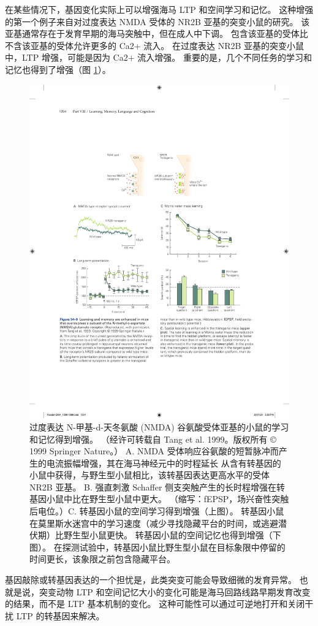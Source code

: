 在某些情况下，基因变化实际上可以增强海马 LTP 和空间学习和记忆。
这种增强的第一个例子来自对过度表达 NMDA 受体的 NR2B 亚基的突变小鼠的研究。
该亚基通常存在于发育早期的海马突触中，但在成人中下调。
包含该亚基的受体比不含该亚基的受体允许更多的 Ca2+ 流入。
在过度表达 NR2B 亚基的突变小鼠中，LTP 增强，可能是因为 Ca2+ 流入增强。
重要的是，几个不同任务的学习和记忆也得到了增强（图 \ref{fig:54_8}）。


\begin{figure}[htbp]
	\centering
	\includegraphics[width=0.75\linewidth]{chap54/fig_54_8}
	\caption{过度表达 N-甲基-d-天冬氨酸 (NMDA) 谷氨酸受体亚基的小鼠的学习和记忆得到增强。 （经许可转载自 Tang et al. 1999。版权所有 © 1999 Springer Nature。） A. NMDA 受体响应谷氨酸的短暂脉冲而产生的电流振幅增强，其在海马神经元中的时程延长 从含有转基因的小鼠中获得，与野生型小鼠相比，该转基因表达更高水平的受体 NR2B 亚基。 B. 强直刺激 Schaffer 侧支突触产生的长时程增强在转基因小鼠中比在野生型小鼠中更大。 （缩写：fEPSP，场兴奋性突触后电位。）C. 转基因小鼠的空间学习得到增强（上图）。 转基因小鼠在莫里斯水迷宫中的学习速度（减少寻找隐藏平台的时间，或逃避潜伏期）比野生型小鼠更快。 转基因小鼠的空间记忆也得到增强（下图）。 在探测试验中，转基因小鼠比野生型小鼠在目标象限中停留的时间更长，该象限之前包含隐藏平台。}
	\label{fig:54_8}
\end{figure}


基因敲除或转基因表达的一个担忧是，此类突变可能会导致细微的发育异常。
也就是说，突变动物 LTP 和空间记忆大小的变化可能是海马回路线路早期发育改变的结果，而不是 LTP 基本机制的变化。
这种可能性可以通过可逆地打开和关闭干扰 LTP 的转基因来解决。


